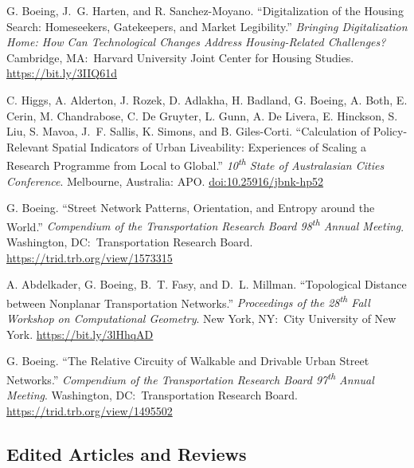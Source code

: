 \documentclass[11pt,a4paper]{report} %
\begin{document}
\begin{tablist}

\item[2023] \tab{}G. Boeing, J.~G. Harten, and R. Sanchez-Moyano. \enquote{Digitalization of the Housing Search: Homeseekers, Gatekeepers, and Market Legibility.} \textit{Bringing Digitalization Home: How Can Technological Changes Address Housing-Related Challenges?} Cambridge, MA:\ Harvard University Joint Center for Housing Studies. \href{https://bit.ly/3IIQ61d}{https://bit.ly/3IIQ61d}

\item[2022] \tab{}C. Higgs, A. Alderton, J. Rozek, D. Adlakha, H. Badland, G. Boeing, A. Both, E. Cerin, M. Chandrabose, C. De Gruyter, L. Gunn, A. De Livera, E. Hinckson, S. Liu, S. Mavoa, J.~F. Sallis, K. Simons, and B. Giles-Corti. \enquote{Calculation of Policy-Relevant Spatial Indicators of Urban Liveability: Experiences of Scaling a Research Programme from Local to Global.} \textit{10\textsuperscript{th} State of Australasian Cities Conference}. Melbourne, Australia: APO\@. \href{https://doi.org/10.25916/jbnk-hp52}{doi:10.25916/jbnk-hp52}

\item[2019] \tab{}G. Boeing. \enquote{Street Network Patterns, Orientation, and Entropy around the World.} \textit{Compendium of the Transportation Research Board 98\textsuperscript{th} Annual Meeting}. Washington, DC:\ Transportation Research Board. \href{https://trid.trb.org/view/1573315}{https://trid.trb.org/view/1573315}

\item[2018] \tab{}A. Abdelkader, G. Boeing, B.~T. Fasy, and D.~L. Millman. \enquote{Topological Distance between Nonplanar Transportation Networks.} \textit{Proceedings of the 28\textsuperscript{th} Fall Workshop on Computational Geometry}. New York, NY:\ City University of New York. \href{https://bit.ly/3lHhqAD}{https://bit.ly/3lHhqAD}

\item[2018] \tab{}G. Boeing. \enquote{The Relative Circuity of Walkable and Drivable Urban Street Networks.} \textit{Compendium of the Transportation Research Board 97\textsuperscript{th} Annual Meeting}. Washington, DC:\ Transportation Research Board. \href{https://trid.trb.org/view/1495502}{https://trid.trb.org/view/1495502}

\end{tablist}

\subsection*{Edited Articles and Reviews}
\end{document}
